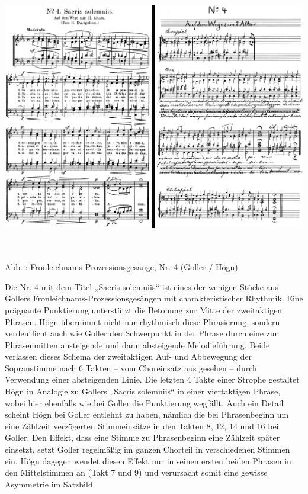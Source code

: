 \includegraphics[width=15.967cm,height=11.947cm]{pictures/zulassungsarbeit-img083.png}


Abb. : Fronleichnams-Prozessionsgesänge, Nr. 4
(Goller / Högn)

Die Nr. 4 mit dem Titel „Sacris solemniis“ ist eines der wenigen Stücke
aus Gollers Fronleichnams-Prozessionsgesängen mit charakteristischer
Rhythmik. Eine prägnante Punktierung unterstützt die Betonung zur Mitte
der zweitaktigen Phrasen. Högn übernimmt nicht nur rhythmisch diese
Phrasierung, sondern verdeutlicht auch wie Goller den Schwerpunkt in
der Phrase durch eine zur Phrasenmitten ansteigende und dann
absteigende Melodieführung. Beide verlassen dieses Schema der
zweitaktigen Auf- und Abbewegung der Sopranstimme nach 6 Takten – vom
Choreinsatz aus gesehen – durch Verwendung einer absteigenden Linie.
Die letzten 4 Takte einer Strophe gestaltet Högn in Analogie zu Gollers
„Sacris solemniis“ in einer viertaktigen Phrase, wobei hier ebenfalls
wie bei Goller die Punktierung wegfällt. Auch ein Detail scheint Högn
bei Goller entlehnt zu haben, nämlich die bei Phrasenbeginn um eine
Zählzeit verzögerten Stimmeinsätze in den Takten 8, 12, 14 und 16 bei
Goller. Den Effekt, dass eine Stimme zu Phrasenbeginn eine Zählzeit
später einsetzt, setzt Goller regelmäßig im ganzen Chorteil in
verschiedenen Stimmen ein. Högn dagegen wendet diesen Effekt nur in
seinen ersten beiden Phrasen in den Mittelstimmen an (Takt 7 und 9) und
verursacht somit eine gewisse Asymmetrie im Satzbild.


